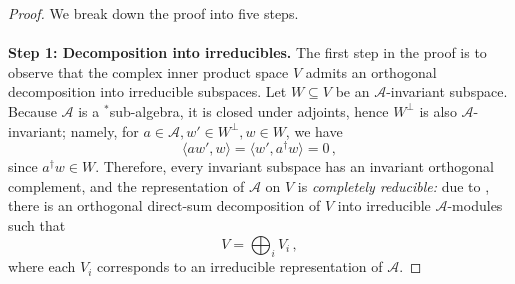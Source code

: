 \documentclass[12pt]{article}
\theoremstyle{plain}
\begin{document}
\begin{proof} We break down the proof into five steps.\ \\
\ \\
\textbf{Step 1: Decomposition into irreducibles.} The first step in the proof is to observe that the complex inner product space $V$ admits an orthogonal decomposition into irreducible subspaces.
Let $W \subseteq V$ be an $\mathcal{A}$-invariant subspace. Because $\mathcal{A}$ is a $^*$sub-algebra, it is closed under adjoints, hence $W^\perp$ is also $\mathcal{A}$-invariant; namely, for $a \in \mathcal{A},w' \in W^\perp, w \in W$, we have
$$
\langle a w', w\rangle = \langle w',a^\dag w\rangle = 0 \, ,
$$
since $a^\dag w \in W$. Therefore, every invariant subspace has an invariant orthogonal complement, and the representation of $\mathcal{A}$ on $V$ is \emph{completely reducible:} due to , there is an orthogonal direct-sum decomposition of $V$ into irreducible $\mathcal{A}$-modules such that
$$
V = \bigoplus_i V_i \, ,
$$
where each $V_i$ corresponds to an irreducible representation of $\mathcal{A}$.


\end{proof}
\end{document}

